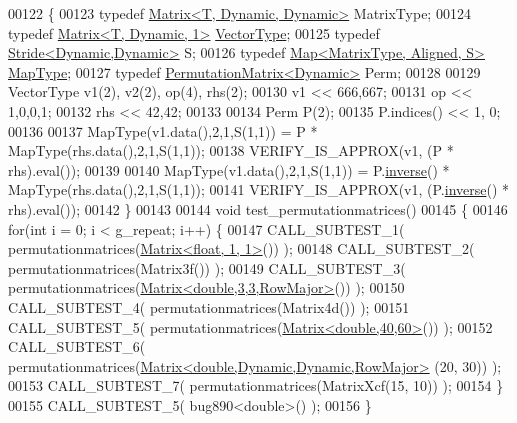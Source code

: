 \begin{DoxyCode}
00122 \{
00123   \textcolor{keyword}{typedef} \hyperlink{group___core___module_class_eigen_1_1_matrix}{Matrix<T, Dynamic, Dynamic>} MatrixType;
00124   \textcolor{keyword}{typedef} \hyperlink{group___core___module_class_eigen_1_1_matrix}{Matrix<T, Dynamic, 1>} \hyperlink{struct_vector_type}{VectorType};
00125   \textcolor{keyword}{typedef} \hyperlink{group___core___module_class_eigen_1_1_stride}{Stride<Dynamic,Dynamic>} S;
00126   \textcolor{keyword}{typedef} \hyperlink{group___core___module_class_eigen_1_1_map}{Map<MatrixType, Aligned, S>} \hyperlink{group___core___module_class_eigen_1_1_map}{MapType};
00127   \textcolor{keyword}{typedef} \hyperlink{group___core___module_class_eigen_1_1_permutation_matrix}{PermutationMatrix<Dynamic>} Perm;
00128   
00129   VectorType v1(2), v2(2), op(4), rhs(2);
00130   v1 << 666,667;
00131   op << 1,0,0,1;
00132   rhs << 42,42;
00133   
00134   Perm P(2);
00135   P.indices() << 1, 0;
00136 
00137   MapType(v1.data(),2,1,S(1,1)) = P * MapType(rhs.data(),2,1,S(1,1));
00138   VERIFY\_IS\_APPROX(v1, (P * rhs).eval());
00139   
00140   MapType(v1.data(),2,1,S(1,1)) = P.\hyperlink{group___geometry___module_a20ca137b84f18b9c41a0fef9c222e0da}{inverse}() * MapType(rhs.data(),2,1,S(1,1));
00141   VERIFY\_IS\_APPROX(v1, (P.\hyperlink{group___geometry___module_a20ca137b84f18b9c41a0fef9c222e0da}{inverse}() * rhs).eval());
00142 \}
00143 
00144 \textcolor{keywordtype}{void} test\_permutationmatrices()
00145 \{
00146   \textcolor{keywordflow}{for}(\textcolor{keywordtype}{int} i = 0; i < g\_repeat; i++) \{
00147     CALL\_SUBTEST\_1( permutationmatrices(\hyperlink{group___core___module_class_eigen_1_1_matrix}{Matrix<float, 1, 1>}()) );
00148     CALL\_SUBTEST\_2( permutationmatrices(Matrix3f()) );
00149     CALL\_SUBTEST\_3( permutationmatrices(\hyperlink{group___core___module_class_eigen_1_1_matrix}{Matrix<double,3,3,RowMajor>}()) );
00150     CALL\_SUBTEST\_4( permutationmatrices(Matrix4d()) );
00151     CALL\_SUBTEST\_5( permutationmatrices(\hyperlink{group___core___module_class_eigen_1_1_matrix}{Matrix<double,40,60>}()) );
00152     CALL\_SUBTEST\_6( permutationmatrices(\hyperlink{group___core___module_class_eigen_1_1_matrix}{Matrix<double,Dynamic,Dynamic,RowMajor>}
      (20, 30)) );
00153     CALL\_SUBTEST\_7( permutationmatrices(MatrixXcf(15, 10)) );
00154   \}
00155   CALL\_SUBTEST\_5( bug890<double>() );
00156 \}
\end{DoxyCode}
